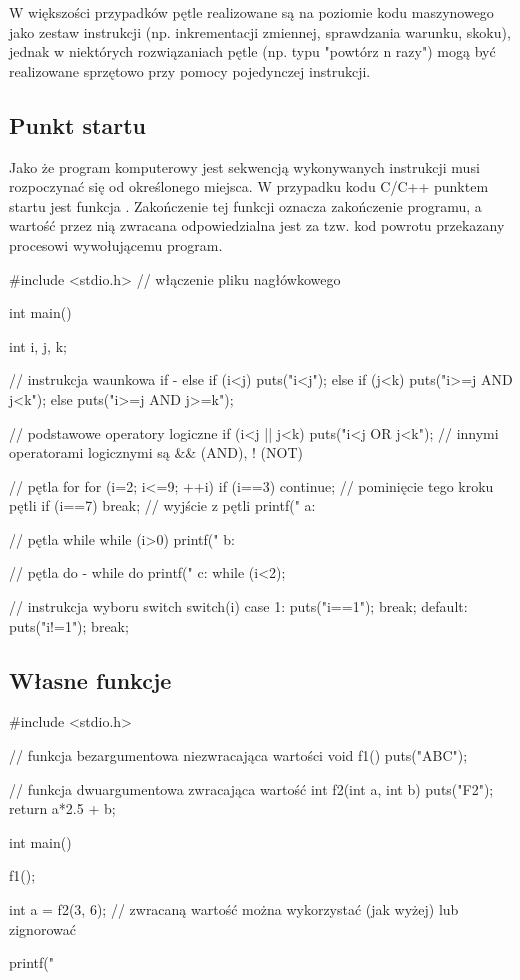 \documentclass{pdfBooklets}
\begin{document}
W większości przypadków pętle realizowane są na poziomie kodu maszynowego jako zestaw instrukcji (np. inkrementacji zmiennej, sprawdzania warunku, skoku), jednak w niektórych rozwiązaniach pętle (np. typu "powtórz n razy") mogą być realizowane sprzętowo przy pomocy pojedynczej instrukcji.

\subsection{Punkt startu}

Jako że program komputerowy jest sekwencją wykonywanych instrukcji musi rozpoczynać się od określonego miejsca.
W przypadku kodu C/C++ punktem startu jest funkcja . Zakończenie tej funkcji oznacza zakończenie programu, a wartość przez nią zwracana odpowiedzialna jest za tzw. kod powrotu przekazany procesowi wywołującemu program. 

\begin{CodeFrame*}[c]{}
#include <stdio.h> // włączenie pliku nagłówkowego

int main() {
  int i, j, k;
  
  // instrukcja waunkowa if - else
  if (i<j) {
    puts("i<j");
  } else if (j<k) {
    puts("i>=j AND j<k");
  } else {
    puts("i>=j AND j>=k");
  }
  
  // podstawowe operatory logiczne
  if (i<j || j<k)
    puts("i<j OR j<k");
  // innymi operatorami logicznymi są && (AND), ! (NOT)
  
  // pętla for
  for (i=2; i<=9; ++i) {
    if (i==3)
      continue; // pominięcie tego kroku pętli
    if (i==7)
      break; // wyjście z pętli
    printf(" a: %
  }
  
  // pętla while
  while (i>0) {
    printf(" b: %
  }
  
  // pętla do - while
  do {
    printf(" c: %
  } while (i<2);
  
  // instrukcja wyboru switch
  switch(i) {
    case 1:
      puts("i==1");
      break;
    default:
      puts("i!=1");
      break;
  }
}
\end{CodeFrame*}

\subsection{Własne funkcje}

\begin{CodeFrame*}[c]{}
#include <stdio.h>

// funkcja bezargumentowa niezwracająca wartości
void f1() {
  puts("ABC");
}

// funkcja dwuargumentowa zwracająca wartość
int f2(int a, int b) {
  puts("F2");
  return a*2.5 + b;
}

int main() {
  f1();
  
  int a = f2(3, 6);
  // zwracaną wartość można wykorzystać (jak wyżej) lub zignorować
  
  printf("%
}
\end{CodeFrame*}
\end{document}

